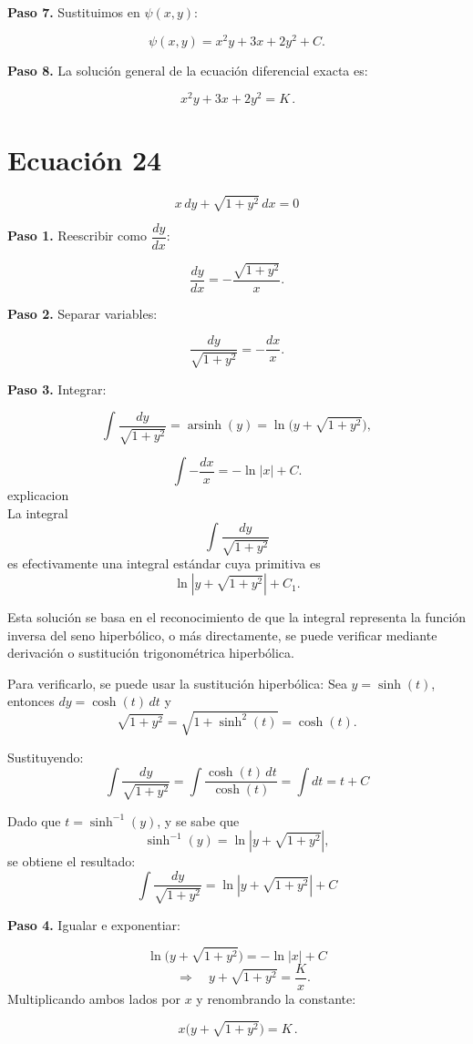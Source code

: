 \documentclass[12pt,a4paper]{article}
\begin{document}
\begin{multicols}{2}
	\textbf{Paso 7.} Sustituimos en \(\psi(x,y)\):
	
	\[
	\psi(x,y) = x^2y + 3x + 2y^2 + C.
	\]
	
	\textbf{Paso 8.} La solución general de la ecuación diferencial exacta es:
	
	\[
	\boxed{\,x^2y + 3x + 2y^2 = K\,}.
	\]
	
	\section*{Ecuación 24}
	
	\[
	x\,dy + \sqrt{1+y^{2}}\,dx = 0
	\]
	
	\textbf{Paso 1.} Reescribir como \(\dfrac{dy}{dx}\):
	
	\[
	\frac{dy}{dx} = -\frac{\sqrt{1+y^{2}}}{x}.
	\]
	
	\textbf{Paso 2.} Separar variables:
	
	\[
	\frac{dy}{\sqrt{1+y^{2}}} = -\frac{dx}{x}.
	\]
	
	\textbf{Paso 3.} Integrar:
	
	\[
	\int \frac{dy}{\sqrt{1+y^{2}}} = \operatorname{arsinh}(y) = \ln\big(y + \sqrt{1+y^2}\big),
	\]
	
	\[
	\int -\frac{dx}{x} = -\ln|x| + C.
	\]
	explicacion\\
	La integral
	\[
	\int \frac{dy}{\sqrt{1+y^2}}
	\]
	es efectivamente una integral estándar cuya primitiva es
	\[
	\ln \left| y + \sqrt{1+y^2} \right| + C_1.
	\]
	
	Esta solución se basa en el reconocimiento de que la integral representa la función inversa del seno hiperbólico, o más directamente, se puede verificar mediante derivación o sustitución trigonométrica hiperbólica.
	
	Para verificarlo, se puede usar la sustitución hiperbólica:  
	Sea \( y = \sinh(t) \), entonces \( dy = \cosh(t)\,dt \) y
	\[
	\sqrt{1+y^2} = \sqrt{1+\sinh^2(t)} = \cosh(t).
	\]
	
	Sustituyendo:
	\[
	\int \frac{dy}{\sqrt{1+y^2}} = \int \frac{\cosh(t)\,dt}{\cosh(t)} = \int dt = t + C
	\]
	
	Dado que \( t = \sinh^{-1}(y) \), y se sabe que
	\[
	\sinh^{-1}(y) = \ln \left| y + \sqrt{1+y^2} \right|,
	\]
	se obtiene el resultado:
	\[
	\int \frac{dy}{\sqrt{1+y^2}} = \ln \left| y + \sqrt{1+y^2} \right| + C
	\]
	
	\textbf{Paso 4.} Igualar e exponentiar:
	
	\[
	\ln\big(y + \sqrt{1+y^2}\big) = -\ln|x| + C
	\]
	\[
	\quad \Rightarrow \quad
	y+\sqrt{1+y^2} = \frac{K}{x}.\]
	Multiplicando ambos lados por \(x\) y renombrando la constante:
	
	\[
	\boxed{\,x\bigl(y+\sqrt{1+y^{2}}\bigr)=K\,}.
	\]
	
\end{multicols}
\end{document}

